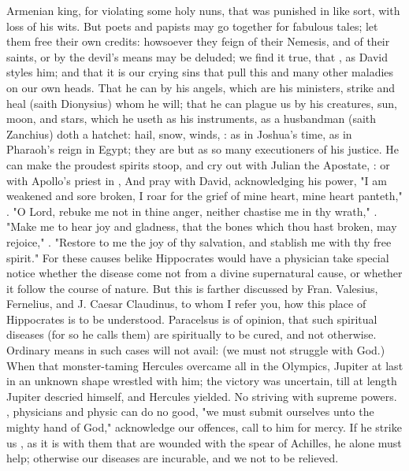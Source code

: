 Armenian king, for violating some holy nuns, that was
punished in like sort, with loss of his wits. But poets and papists may go
together for fabulous tales; let them free their own credits: howsoever they
feign of their Nemesis, and of their saints, or by the devil's means may be
deluded; we find it true, that , as David styles him; and that it is our crying
sins that pull this and many other maladies on our own heads. That he can by
his angels, which are his ministers, strike and heal (saith
Dionysius) whom he will; that he can plague us by his
creatures, sun, moon, and stars, which he useth as his instruments, as a
husbandman (saith Zanchius) doth a hatchet: hail, snow, winds, \etc{}
: as in
Joshua's time, as in Pharaoh's reign in Egypt; they are but as so many
executioners of his justice. He can make the proudest spirits stoop, and cry
out with Julian the Apostate, : or with Apollo's priest in
\Chrysostom{},   And pray with David, acknowledging his power, "I
am weakened and sore broken, I roar for the grief of mine heart, mine heart
panteth," \etc{} . "O Lord, rebuke me not in
thine anger, neither chastise me in thy wrath," . "Make me to hear joy and gladness, that the bones which thou hast broken,
may rejoice," . "Restore to me the joy
of thy salvation, and stablish me with thy free spirit." For these causes
belike Hippocrates would have a physician take special
notice whether the disease come not from a divine supernatural cause, or
whether it follow the course of nature. But this is farther discussed by Fran.
Valesius, 
Fernelius, and J. Caesar Claudinus,
to whom I refer you, how this place of Hippocrates is to be understood.
Paracelsus is of opinion, that such spiritual diseases (for so he calls them)
are spiritually to be cured, and not otherwise. Ordinary means in such cases
will not avail:  (we must not struggle with
God.) When that monster-taming Hercules overcame all in the Olympics, Jupiter
at last in an unknown shape wrestled with him; the victory was uncertain, till
at length Jupiter descried himself, and Hercules yielded. No striving with
supreme powers. , physicians
and physic can do no good, "we must submit ourselves unto
the mighty hand of God," acknowledge our offences, call to him for mercy. If he
strike us , as it is with them that
are wounded with the spear of Achilles, he alone must help; otherwise our
diseases are incurable, and we not to be relieved.

